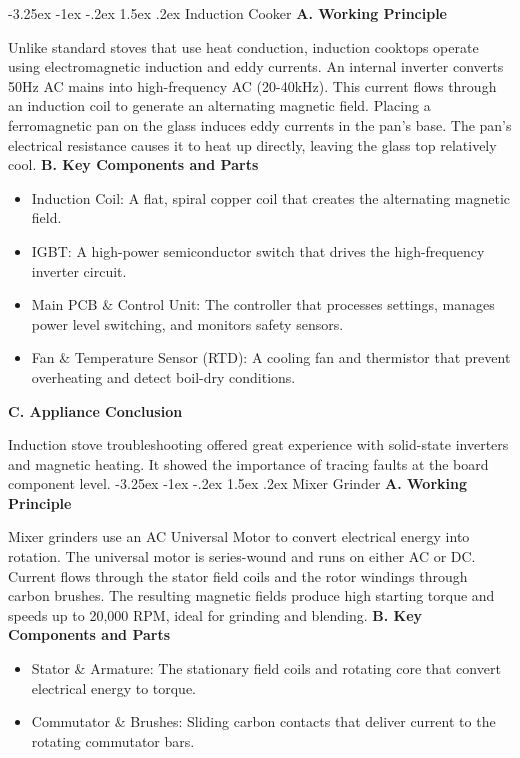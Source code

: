 \documentclass[11pt,a4paper]{report}
\makeatletter
\renewcommand{\section}{\@startsection{section}{1}{\z@}%
  {-3.25ex \@plus -1ex \@minus -.2ex}%
  {1.5ex \@plus.2ex}%
  {\normalfont\Large\bfseries\color{primaryColor}}}
\makeatother
\begin{document}
\section{Induction Cooker}
\noindent\textbf{A. Working Principle}\par\medskip
Unlike standard stoves that use heat conduction, induction cooktops operate using electromagnetic induction and eddy currents. An internal inverter converts 50Hz AC mains into high-frequency AC (20-40kHz). This current flows through an induction coil to generate an alternating magnetic field. Placing a ferromagnetic pan on the glass induces eddy currents in the pan's base. The pan's electrical resistance causes it to heat up directly, leaving the glass top relatively cool.
\noindent\textbf{B. Key Components and Parts}\par\medskip
\begin{itemize}
  \item Induction Coil: A flat, spiral copper coil that creates the alternating magnetic field.
  \item IGBT: A high-power semiconductor switch that drives the high-frequency inverter circuit.
  \item Main PCB \& Control Unit: The controller that processes settings, manages power level switching, and monitors safety sensors.
  \item Fan \& Temperature Sensor (RTD): A cooling fan and thermistor that prevent overheating and detect boil-dry conditions.
\end{itemize}
\noindent\textbf{C. Appliance Conclusion}\par\medskip
Induction stove troubleshooting offered great experience with solid-state inverters and magnetic heating. It showed the importance of tracing faults at the board component level.
\section{Mixer Grinder}
\noindent\textbf{A. Working Principle}\par\medskip
Mixer grinders use an AC Universal Motor to convert electrical energy into rotation. The universal motor is series-wound and runs on either AC or DC. Current flows through the stator field coils and the rotor windings through carbon brushes. The resulting magnetic fields produce high starting torque and speeds up to 20,000 RPM, ideal for grinding and blending.
\noindent\textbf{B. Key Components and Parts}\par\medskip
\begin{itemize}
  \item Stator \& Armature: The stationary field coils and rotating core that convert electrical energy to torque.
  \item Commutator \& Brushes: Sliding carbon contacts that deliver current to the rotating commutator bars.
\end{itemize}
\end{document}
